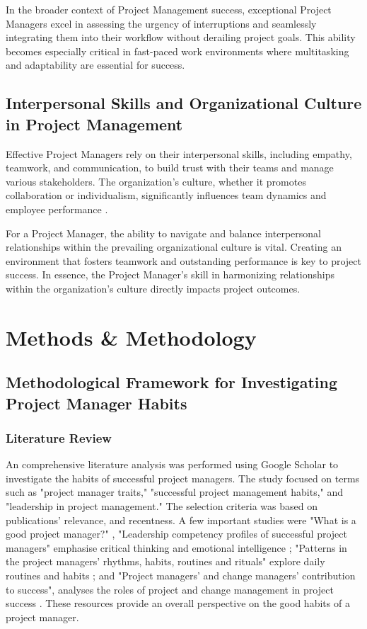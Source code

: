 \documentclass{article}
\begin{document}
In the broader context of Project Management success, exceptional Project Managers excel in assessing the urgency of interruptions and seamlessly integrating them into their workflow without derailing project goals. This ability becomes especially critical in fast-paced work environments where multitasking and adaptability are essential for success.

\subsection{Interpersonal Skills and Organizational Culture in Project Management}

Effective Project Managers rely on their interpersonal skills, including empathy, teamwork, and communication, to build trust with their teams and manage various stakeholders. The organization's culture, whether it promotes collaboration or individualism, significantly influences team dynamics and employee performance \cite{nusari2018impact}.

For a Project Manager, the ability to navigate and balance interpersonal relationships within the prevailing organizational culture is vital. Creating an environment that fosters teamwork and outstanding performance is key to project success. In essence, the Project Manager's skill in harmonizing relationships within the organization's culture directly impacts project outcomes.


\section{Methods \& Methodology}

\subsection{Methodological Framework for Investigating Project Manager Habits}

\subsubsection{Literature Review}

An comprehensive literature analysis was performed using Google Scholar to investigate the habits of successful project managers. The study focused on terms such as "project manager traits," "successful project management habits," and "leadership in project management." The selection criteria was based on publications' relevance, and recentness. A few important studies were "What is a good project manager?" \cite{bredillet2015good}, "Leadership competency profiles of successful project managers" emphasise critical thinking and emotional intelligence \cite{muller2010leadership}; "Patterns in the project managers’ rhythms, habits, routines and rituals" explore daily routines and habits \cite{sigurdhssonpatterns}; and "Project managers’ and change managers’ contribution to success", analyses the roles of project and change management in project success \cite{pollack2016project}. These resources provide an overall perspective on the good habits of a project manager.
\end{document}
